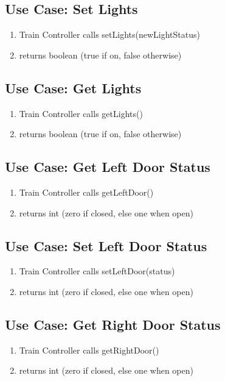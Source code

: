 \documentclass{scrreprt}
\begin{document}
\subsection{Use Case: Set Lights}
\begin{enumerate}
	\item Train Controller calls setLights(newLightStatus)
	\item returns boolean (true if on, false otherwise)
\end{enumerate}

\subsection{Use Case: Get Lights}
\begin{enumerate}
	\item Train Controller calls getLights()
	\item returns boolean (true if on, false otherwise)
\end{enumerate}

\subsection{Use Case: Get Left Door Status}
\begin{enumerate}
	\item Train Controller calls getLeftDoor()
	\item returns int (zero if closed, else one when open)
\end{enumerate}

\subsection{Use Case: Set Left Door Status}
\begin{enumerate}
	\item Train Controller calls setLeftDoor(status)
	\item returns int (zero if closed, else one when open)
\end{enumerate}

\subsection{Use Case: Get Right Door Status}
\begin{enumerate}
	\item Train Controller calls getRightDoor()
	\item returns int (zero if closed, else one when open)
\end{enumerate}
\end{document}
